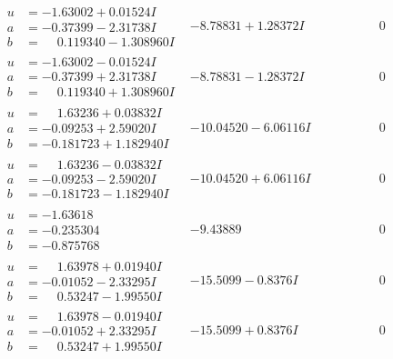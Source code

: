 \documentclass[1p]{elsarticle_modified}
\theoremstyle{definition}
\begin{document}
$$\begin{array}{c|c|c}
\begin{aligned}
u &= -1.63002 + 0.01524 I \\
a &= -0.37399 - 2.31738 I \\
b &= \phantom{-}0.119340 - 1.308960 I\end{aligned}
 & -8.78831 + 1.28372 I & \phantom{-0.000000 } 0 \\ \hline\begin{aligned}
u &= -1.63002 - 0.01524 I \\
a &= -0.37399 + 2.31738 I \\
b &= \phantom{-}0.119340 + 1.308960 I\end{aligned}
 & -8.78831 - 1.28372 I & \phantom{-0.000000 } 0 \\ \hline\begin{aligned}
u &= \phantom{-}1.63236 + 0.03832 I \\
a &= -0.09253 + 2.59020 I \\
b &= -0.181723 + 1.182940 I\end{aligned}
 & -10.04520 - 6.06116 I & \phantom{-0.000000 } 0 \\ \hline\begin{aligned}
u &= \phantom{-}1.63236 - 0.03832 I \\
a &= -0.09253 - 2.59020 I \\
b &= -0.181723 - 1.182940 I\end{aligned}
 & -10.04520 + 6.06116 I & \phantom{-0.000000 } 0 \\ \hline\begin{aligned}
u &= -1.63618\phantom{ +0.000000I} \\
a &= -0.235304\phantom{ +0.000000I} \\
b &= -0.875768\phantom{ +0.000000I}\end{aligned}
 & -9.43889\phantom{ +0.000000I} & \phantom{-0.000000 } 0 \\ \hline\begin{aligned}
u &= \phantom{-}1.63978 + 0.01940 I \\
a &= -0.01052 - 2.33295 I \\
b &= \phantom{-}0.53247 - 1.99550 I\end{aligned}
 & -15.5099 - 0.8376 I & \phantom{-0.000000 } 0 \\ \hline\begin{aligned}
u &= \phantom{-}1.63978 - 0.01940 I \\
a &= -0.01052 + 2.33295 I \\
b &= \phantom{-}0.53247 + 1.99550 I\end{aligned}
 & -15.5099 + 0.8376 I & \phantom{-0.000000 } 0\\

\end{array}$$
\end{document}
